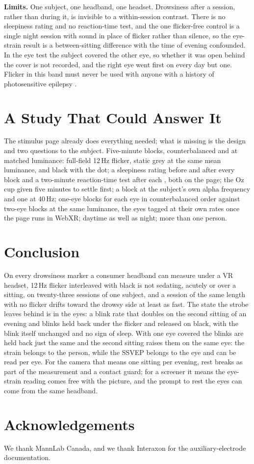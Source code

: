 \documentclass[conference]{IEEEtran}
\begin{document}
\textbf{Limits.} One subject, one headband, one headset. Drowsiness after a session, rather than during it, is invisible to a within-session contrast. There is no sleepiness rating and no reaction-time test, and the one flicker-free control is a single night session with sound in place of flicker rather than silence, so the eye-strain result is a between-sitting difference with the time of evening confounded. In the eye test the subject covered the other eye, so whether it was open behind the cover is not recorded, and the right eye went first on every day but one. Flicker in this band must never be used with anyone with a history of photosensitive epilepsy \cite{fisher2005photic}.

\section{A Study That Could Answer It}

The stimulus page already does everything needed; what is missing is the design and two questions to the subject. Five-minute blocks, counterbalanced and at matched luminance: full-field 12\,Hz flicker, static grey at the same mean luminance, and black with the dot; a sleepiness rating before and after every block \cite{akerstedt1990kss} and a two-minute reaction-time test after each \cite{dinges1985pvt}, both on the page; the Oz cup given five minutes to settle first; a block at the subject's own alpha frequency and one at 40\,Hz; one-eye blocks for each eye in counterbalanced order against two-eye blocks at the same luminance, the eyes tagged at their own rates once the page runs in WebXR; daytime as well as night; more than one person.

\section{Conclusion}

On every drowsiness marker a consumer headband can measure under a VR headset, 12\,Hz flicker interleaved with black is not sedating, acutely or over a sitting, on twenty-three sessions of one subject, and a session of the same length with no flicker drifts toward the drowsy side at least as fast. The state the strobe leaves behind is in the eyes: a blink rate that doubles on the second sitting of an evening and blinks held back under the flicker and released on black, with the blink itself unchanged and no sign of sleep. With one eye covered the blinks are held back just the same and the second sitting raises them on the same eye: the strain belongs to the person, while the SSVEP belongs to the eye and can be read per eye. For the camera that means one sitting per evening, rest breaks as part of the measurement and a contact guard; for a screener it means the eye-strain reading comes free with the picture, and the prompt to rest the eyes can come from the same headband.

\section*{Acknowledgements}
We thank MannLab Canada, and we thank Interaxon for the auxiliary-electrode documentation.



\end{document}

